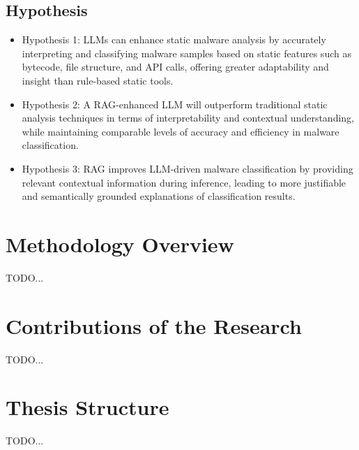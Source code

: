 \subsection{Hypothesis}
\begin{itemize}
	\item Hypothesis 1: LLMs can enhance static malware analysis by accurately interpreting and classifying
	      malware samples based on static features such as bytecode, file structure, and API calls, offering
	      greater adaptability and insight than rule-based static tools.
	\item Hypothesis 2: A RAG-enhanced LLM will outperform traditional static analysis techniques in terms of
	      interpretability and contextual understanding, while maintaining comparable levels of accuracy and
	      efficiency in malware classification.
	\item Hypothesis 3: RAG improves LLM-driven malware classification by providing relevant contextual
	      information during inference, leading to more justifiable and semantically grounded explanations of
	      classification results.
\end{itemize}

\section{Methodology Overview}
TODO...

\section{Contributions of the Research}
TODO...

\section{Thesis Structure}
TODO...

